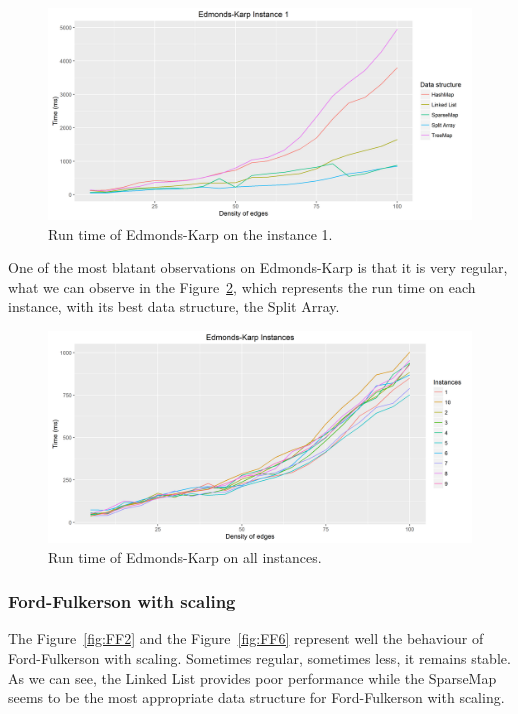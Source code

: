 \begin{figure}[H]
\includegraphics[scale=0.65]{images/EK1.png}
\caption{Run time of Edmonds-Karp on the instance 1.}
\label{fig:EK1}
\end{figure}

One of the most blatant observations on Edmonds-Karp is that it is very regular, what we can observe in the Figure~\ref{fig:EKmean}, which represents the run time on each instance, with its best data structure, the Split Array.

\begin{figure}[H]
\includegraphics[scale=0.65]{images/EKmean.png}
\caption{Run time of Edmonds-Karp on all instances.}
\label{fig:EKmean}
\end{figure}

\subsubsection{Ford-Fulkerson with scaling}
The Figure~\ref{fig:FF2} and the Figure~\ref{fig:FF6} represent well the behaviour of Ford-Fulkerson with scaling. Sometimes regular, sometimes less, it remains stable. As we can see, the Linked List provides poor performance while the SparseMap seems to be the most appropriate data structure for Ford-Fulkerson with scaling.

